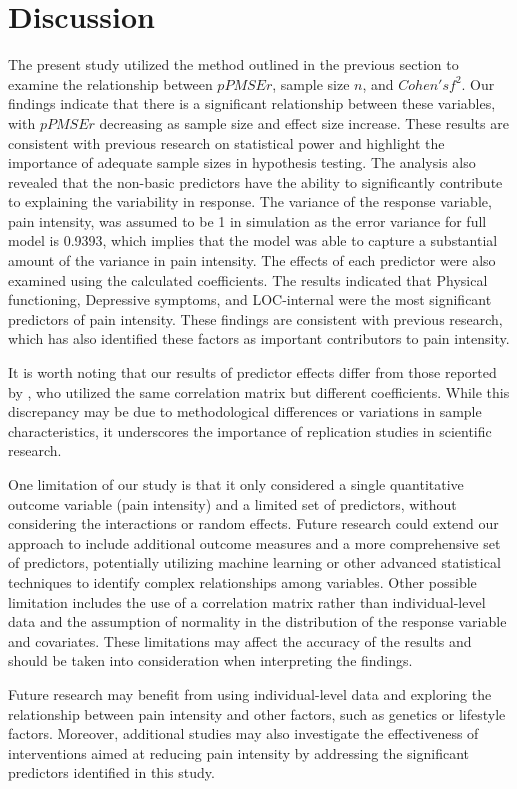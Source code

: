 \chapter{Discussion}

The present study utilized the method outlined in the previous section to examine the relationship between $pPMSEr$, sample size $n$, and $Cohen's f^2$. Our findings indicate that there is a significant relationship between these variables, with $pPMSEr$ decreasing as sample size and effect size increase. These results are consistent with previous research on statistical power and highlight the importance of adequate sample sizes in hypothesis testing.
The analysis also revealed that the non-basic predictors have the ability to significantly contribute to explaining the variability in response. The variance of the response variable, pain intensity, was assumed to be 1 in simulation as the error variance for full model is 0.9393, which implies that the model was able to capture a substantial amount of the variance in pain intensity.
The effects of each predictor were also examined using the calculated coefficients. The results indicated that Physical functioning, Depressive symptoms, and LOC-internal were the most significant predictors of pain intensity. These findings are consistent with previous research, which has also identified these factors as important contributors to pain intensity.

It is worth noting that our results of predictor effects differ from those reported by \cite{baker2008chronicpain}, who utilized the same correlation matrix but different coefficients. While this discrepancy may be due to methodological differences or variations in sample characteristics, it underscores the importance of replication studies in scientific research.

One limitation of our study is that it only considered a single quantitative outcome variable (pain intensity) and a limited set of predictors, without considering the interactions or random effects. Future research could extend our approach to include additional outcome measures and a more comprehensive set of predictors, potentially utilizing machine learning or other advanced statistical techniques to identify complex relationships among variables. Other possible limitation includes the use of a correlation matrix rather than individual-level data and the assumption of normality in the distribution of the response variable and covariates. These limitations may affect the accuracy of the results and should be taken into consideration when interpreting the findings.



Future research may benefit from using individual-level data and exploring the relationship between pain intensity and other factors, such as genetics or lifestyle factors. Moreover, additional studies may also investigate the effectiveness of interventions aimed at reducing pain intensity by addressing the significant predictors identified in this study.


